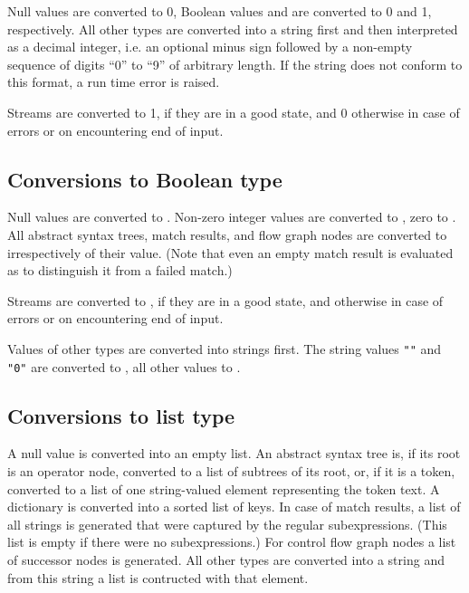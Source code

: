 Null values are converted to 0, Boolean values  and
 are converted to 0 and 1, respectively. All other types are
converted into a string first and then interpreted as a decimal integer,
i.e. an optional minus sign followed by a non-empty sequence of digits
``0'' to ``9'' of arbitrary length. If the string does not conform to
this format, a run time error is raised.

Streams are converted to 1, if they are in a good
state, and 0 otherwise in case of errors or on encountering end
of input.

\subsection{Conversions to Boolean type}\label{boolconv}

Null values are converted to .
Non-zero integer values are converted to , zero to .
All abstract syntax trees, match results, and flow graph nodes are
converted to  irrespectively of their value. (Note that
even an empty match result is evaluated as  to distinguish
it from a failed match.)

Streams are converted to , if they are
in a good state, and  otherwise in case of errors or on
encountering end of input.

Values of other types are converted into
strings first. The string values \lstinline!""! and \lstinline!"0"!
are converted to , all other values to .

\subsection{Conversions to list type}

\label{listconv}
A null value is converted into an empty list. An abstract syntax tree
is, if its root is an operator node, converted to a list of subtrees of
its root, or, if it is a token, converted to a list of one string-valued
element representing the token text. A dictionary is converted into a
sorted list of keys. In case of match results, a list of all strings
is generated that were captured by the regular subexpressions. (This
list is empty if there were no subexpressions.) For control flow graph
nodes a list of successor nodes is generated. All other types are
converted into a string and from this string a list is contructed with
that element.

